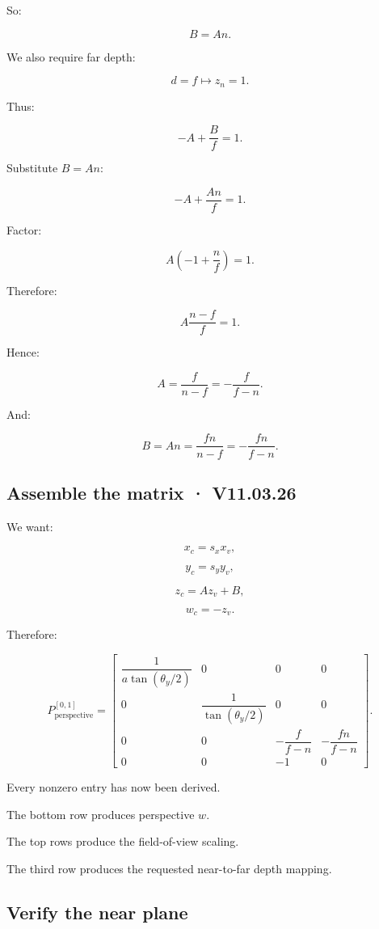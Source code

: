 So:

\[
 \boxed{B=An}.
\]

We also require far depth:

\[
 d=f\longmapsto z_n=1.
\]

Thus:

\[
 -A+\frac Bf=1.
\]

Substitute \(B=An\):

\[
 -A+\frac{An}{f}=1.
\]

Factor:

\[
 A\left(-1+\frac nf\right)=1.
\]

Therefore:

\[
 A\frac{n-f}{f}=1.
\]

Hence:

\[
 \boxed{ A=\frac f{n-f} =-\frac f{f-n} }.
\]

And:

\[
 \boxed{ B=An= \frac{fn}{n-f} =-\frac{fn}{f-n} }.
\]

\subsection{Assemble the matrix · V11.03.26}\label{02-foundations-ii-ch033-assemble-the-matrix-v11.03.26}

We want:

\[
 x_c=s_xx_v,
\]

\[
 y_c=s_yy_v,
\]

\[
 z_c=Az_v+B,
\]

\[
 w_c=-z_v.
\]

Therefore:

\[
 \boxed{ P_{\mathrm{perspective}}^{[0,1]}= \begin{bmatrix} \dfrac1{a\tan(\theta_y/2)}&0&0&0\\ 0&\dfrac1{\tan(\theta_y/2)}&0&0\\ 0&0&-\dfrac f{f-n}&-\dfrac{fn}{f-n}\\ 0&0&-1&0 \end{bmatrix} }.
\]

Every nonzero entry has now been derived.

The bottom row produces perspective \(w\).

The top rows produce the field-of-view scaling.

The third row produces the requested near-to-far depth mapping.

\subsection{Verify the near plane}\label{02-foundations-ii-ch033-verify-the-near-plane}

